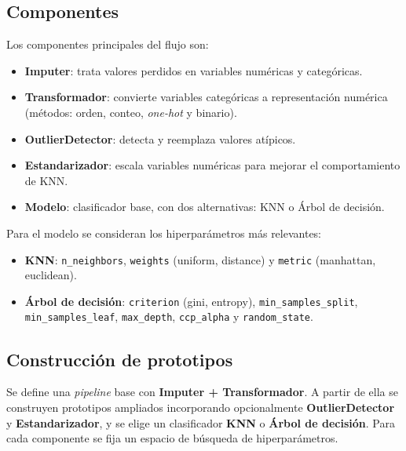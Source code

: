 \documentclass[12pt]{article}
\begin{document}
\subsection{Componentes}
Los componentes principales del flujo son:
\begin{itemize}
    \item \textbf{Imputer}: trata valores perdidos en variables numéricas y categóricas.
    \item \textbf{Transformador}: convierte variables categóricas a representación numérica
    (métodos: orden, conteo, \emph{one-hot} y binario).
    \item \textbf{OutlierDetector}: detecta y reemplaza valores atípicos.
    \item \textbf{Estandarizador}: escala variables numéricas para mejorar el comportamiento de KNN.
    \item \textbf{Modelo}: clasificador base, con dos alternativas: KNN o Árbol de decisión.
\end{itemize}

Para el modelo se consideran los hiperparámetros más relevantes:
\begin{itemize}
    \item \textbf{KNN}: \texttt{n\_neighbors}, \texttt{weights} (uniform, distance) y
    \texttt{metric} (manhattan, euclidean).
    \item \textbf{Árbol de decisión}: \texttt{criterion} (gini, entropy), \texttt{min\_samples\_split},
    \texttt{min\_samples\_leaf}, \texttt{max\_depth}, \texttt{ccp\_alpha} y \texttt{random\_state}.
\end{itemize}

\subsection{Construcción de prototipos}
Se define una \emph{pipeline} base con \textbf{Imputer + Transformador}. A partir de ella se construyen
prototipos ampliados incorporando opcionalmente \textbf{OutlierDetector} y \textbf{Estandarizador}, y se
elige un clasificador \textbf{KNN} o \textbf{Árbol de decisión}. Para cada componente se fija un espacio
de búsqueda de hiperparámetros.
\end{document}
